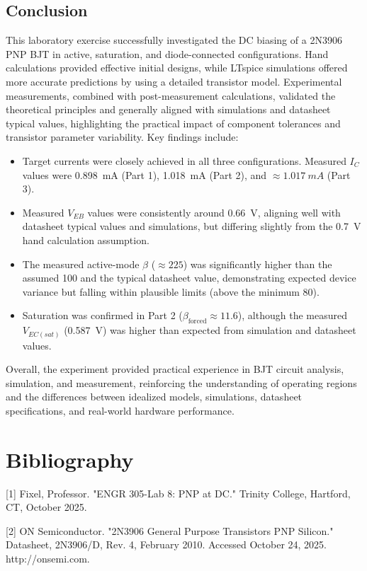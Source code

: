 \documentclass[12pt]{article}
\begin{document}
\subsection{Conclusion}
This laboratory exercise successfully investigated the DC biasing of a 2N3906 PNP BJT in active, saturation, and diode-connected configurations. Hand calculations provided effective initial designs, while LTspice simulations offered more accurate predictions by using a detailed transistor model. Experimental measurements, combined with post-measurement calculations, validated the theoretical principles and generally aligned with simulations and datasheet typical values, highlighting the practical impact of component tolerances and transistor parameter variability. Key findings include:
\begin{itemize}
    \item Target currents were closely achieved in all three configurations. Measured $I_C$ values were \SI{0.898}{mA} (Part 1), \SI{1.018}{mA} (Part 2), and $\approx \SI{1.017}{mA}$ (Part 3).
    \item Measured $V_{EB}$ values were consistently around \SI{0.66}{V}, aligning well with datasheet typical values and simulations, but differing slightly from the \SI{0.7}{V} hand calculation assumption.
    \item The measured active-mode $\beta$ ($\approx 225$) was significantly higher than the assumed 100 and the typical datasheet value, demonstrating expected device variance but falling within plausible limits (above the minimum 80).
    \item Saturation was confirmed in Part 2 ($\beta_{\text{forced}} \approx 11.6$), although the measured $V_{EC(sat)}$ (\SI{0.587}{V}) was higher than expected from simulation and datasheet values.
\end{itemize}
Overall, the experiment provided practical experience in BJT circuit analysis, simulation, and measurement, reinforcing the understanding of operating regions and the differences between idealized models, simulations, datasheet specifications, and real-world hardware performance.

\section{Bibliography}
[1] Fixel, Professor. "ENGR 305-Lab 8: PNP at DC." Trinity College, Hartford, CT, October 2025.
\newline

[2] ON Semiconductor. "2N3906 General Purpose Transistors PNP Silicon." Datasheet, 2N3906/D, Rev. 4, February 2010. Accessed October 24, 2025. http://onsemi.com.
\end{document}
